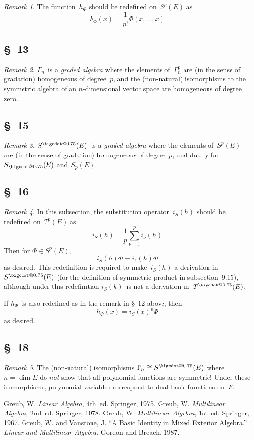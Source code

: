 \documentclass[letterpaper,12pt]{article}
\makeatletter
\newcommand{\iso}{\cong}
\newcommand{\bigcdot}[1]{\mathbin{\mathpalette\bigcdot@{#1}}}
\newcommand{\bigcdot@}[2]{%
  \sbox0{$#1\vcenter{}$}%
  \sbox2{$#1\cdot\m@th$}%
  \hbox{%
    \hfil
    \raise\ht0\hbox{%
      \scalebox{#2}{%
        \lower\ht0\hbox{$#1\bullet\m@th$}%
      }%
    }%
    \hfil
  }%
}
\newcommand{\tdot}{\bigcdot{0.75}}
\newcommand{\adot}{\bigcdot{0.75}}
\newcommand{\sdot}{\bigcdot{0.75}}
\theoremstyle{definition}
\theoremstyle{remark}
\newtheorem*{rmk}{Remark}
\makeatother
\begin{document}
\begin{rmk}
The function~\(h_{\Phi}\) should be redefined on~\(S^p(E)\) as
\[h_{\Phi}(x)=\frac{1}{p!}\Phi(x,\ldots,x)\]
\end{rmk}

\subsection*{\S~13}
\begin{rmk}
\(\Gamma_n\)~is a \emph{graded algebra} where the elements of~\(\Gamma_n^p\) are (in the sense of gradation) homogeneous of degree~\(p\), and the (non-natural) isomorphisms to the symmetric algebra of an \(n\)-dimensional vector space are homogeneous of degree zero.
\end{rmk}

\subsection*{\S~15}
\begin{rmk}
\(S^{\sdot}(E)\)~is a \emph{graded algebra} where the elements of~\(S^p(E)\) are (in the sense of gradation) homogeneous of degree~\(p\), and dually for \(S_{\sdot}(E)\) and~\(S_p(E)\).
\end{rmk}

\subsection*{\S~16}
\begin{rmk}
In this subsection, the substitution operator~\(i_S(h)\) should be redefined on~\(T^p(E)\) as
\[i_S(h)=\frac{1}{p}\sum_{\nu=1}^p i_{\nu}(h)\]
Then for \(\Phi\in S^p(E)\),
\[i_S(h)\Phi=i_1(h)\Phi\]
as desired. This redefinition is required to make~\(i_S(h)\) a derivation in~\(S^{\adot}(E)\) (for the definition of symmetric product in subsection~9.15), although under this redefinition \(i_S(h)\)~is not a derivation in~\(T^{\tdot}(E)\).

If \(h_{\Phi}\)~is also redefined as in the remark in \S~12 above, then
\[h_{\Phi}(x)=i_S(x)^p\Phi\]
as desired.
\end{rmk}

\subsection*{\S~18}
\begin{rmk}
The (non-natural) isomorphisms \(\Gamma_n\iso S^{\sdot}(E)\) where \(n=\dim E\) do \emph{not} show that all polynomial functions are symmetric! Under these isomorphisms, polynomial variables correspond to dual basis functions on~\(E\).
\end{rmk}

\newpage
\begin{thebibliography}{0}
 Greub, W. \textit{Linear Algebra}, 4th~ed. Springer, 1975.
 Greub, W. \textit{Multilinear Algebra}, 2nd~ed. Springer, 1978.
 Greub, W. \textit{Multilinear Algebra}, 1st~ed. Springer, 1967.
 Greub, W. and Vanstone, J. ``A Basic Identity in Mixed Exterior Algebra.'' \textit{Linear and Multilinear Algebra}. Gordon and Breach, 1987.
\end{thebibliography}
\end{document}
